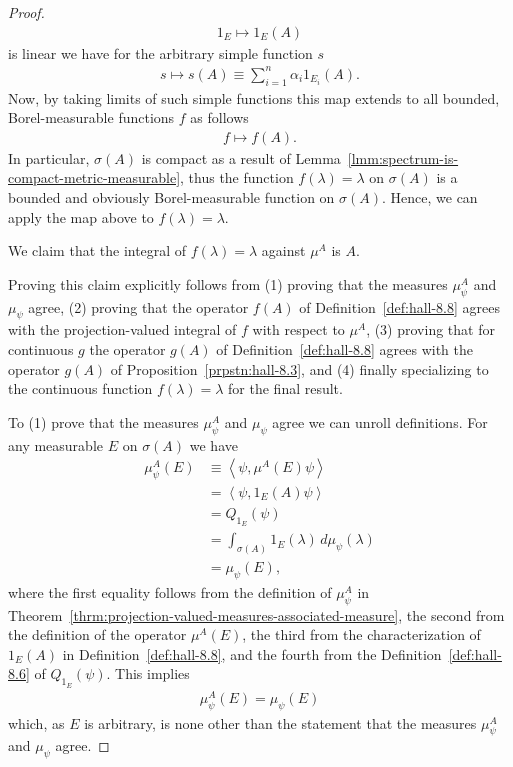 \begin{proof}
\begin{align}
    1_E \longmapsto 1_E(A)
\end{align}
is linear we have for the arbitrary simple function $s$
\begin{align}
    s \longmapsto s(A) \equiv \sum_{i = 1}^n \alpha_i 1_{E_i}(A).
\end{align}
Now, by taking limits of such simple functions this map extends to all bounded, Borel-measurable functions $f$ as follows
\begin{align}
    f \longmapsto f(A).
\end{align}
In particular, $\sigma(A)$ is compact as a result of Lemma~\ref{lmm:spectrum-is-compact-metric-measurable}, thus the function $f(\lambda) = \lambda$ on $\sigma(A)$ is a bounded and obviously Borel-measurable function on $\sigma(A)$. Hence, we can apply the map above to $f(\lambda) = \lambda$.

We claim that the integral of $f(\lambda) = \lambda$ against $\mu^A$ is $A$.

Proving this claim explicitly follows from (1) proving that the measures $\mu^A_\psi$ and $\mu_\psi$ agree, (2) proving that the operator $f(A)$ of Definition~\ref{def:hall-8.8} agrees with the projection-valued integral of $f$ with respect to $\mu^A$, (3) proving that for continuous $g$ the operator $g(A)$ of Definition~\ref{def:hall-8.8} agrees with the operator $g(A)$ of Proposition~\ref{prpstn:hall-8.3}, and (4) finally specializing to the continuous function $f(\lambda) = \lambda$ for the final result.

To (1) prove that the measures $\mu^A_\psi$ and $\mu_\psi$ agree we can unroll definitions. For any measurable $E$ on $\sigma(A)$ we have
\begin{align}
    \mu^A_\psi(E) &\equiv \left< \psi, \mu^A(E) \psi \right> \\
                  &=      \left< \psi, 1_E(A) \psi \right> \\
                  &=      Q_{1_E}(\psi) \\
                  &=      \int_{\sigma(A)} 1_E(\lambda) \, d\mu_\psi(\lambda) \\
                  &=      \mu_\psi(E),
\end{align}
where the first equality follows from the definition of $\mu^A_\psi$ in Theorem~\ref{thrm:projection-valued-measures-associated-measure}, the second from the definition of the operator $\mu^A(E)$, the third from the characterization of $1_E(A)$ in Definition~\ref{def:hall-8.8}, and the fourth from the Definition~\ref{def:hall-8.6} of $Q_{1_E}(\psi)$. This implies
\begin{align}
    \mu^A_\psi(E) = \mu_\psi(E)
\end{align}
which, as $E$ is arbitrary, is none other than the statement that the measures $\mu^A_\psi$ and $\mu_\psi$ agree.
\end{proof}

